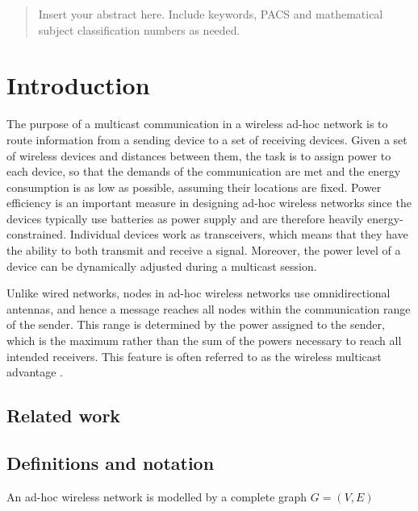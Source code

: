 \date{Received: date / Accepted: date}


\maketitle

\begin{abstract}
Insert your abstract here. Include keywords, PACS and mathematical
subject classification numbers as needed.
\end{abstract}

\section{Introduction}

\label{intro}

The purpose of a multicast communication in a wireless ad-hoc network is to route information from a sending device to a set of receiving devices. Given a set of wireless devices and distances between them, the task is to assign power to each device, so that the demands of the communication are met and the energy consumption is as low as possible, assuming their locations are fixed. Power efficiency is an important measure in designing ad-hoc wireless networks since the devices typically use batteries as power supply and are therefore heavily energy-constrained. Individual devices work as transceivers, which means that they have the ability to both transmit and receive a signal. Moreover, the power level of a device can be dynamically adjusted during a multicast session.

Unlike wired networks, nodes in ad-hoc wireless networks use omnidirectional antennas, and hence a message reaches all nodes within the communication range of the sender. This range is determined by the power assigned to the sender, which is the maximum rather than the sum of the powers necessary to reach all intended receivers. This feature is often referred to as the wireless multicast advantage \cite{Wieseltier00onthe}. 

\subsection{Related work}
\subsection{Definitions and notation}
An ad-hoc wireless network is modelled by a complete graph $G=(V,E)$
